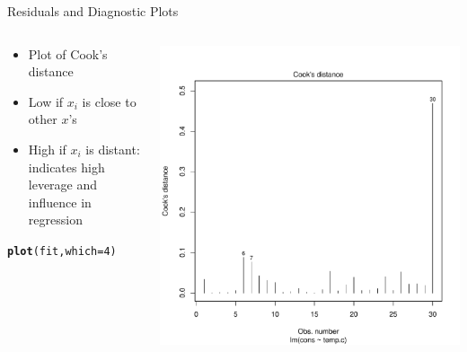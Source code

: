 \documentclass[aspectratio=169]{beamer}\usepackage[]{graphicx}\usepackage[]{color}
\makeatletter
\def\maxwidth{ %
  \ifdim\Gin@nat@width>\linewidth
    \linewidth
  \else
    \Gin@nat@width
  \fi
}
\newcommand{\hlnum}[1]{\textcolor[rgb]{0.686,0.059,0.569}{#1}}%
\newcommand{\hlstd}[1]{\textcolor[rgb]{0.345,0.345,0.345}{#1}}%
\newcommand{\hlkwc}[1]{\textcolor[rgb]{0.333,0.667,0.333}{#1}}%
\newcommand{\hlkwd}[1]{\textcolor[rgb]{0.737,0.353,0.396}{\textbf{#1}}}%
\newenvironment{kframe}{%
 \def\at@end@of@kframe{}%
 \ifinner\ifhmode%
  \def\at@end@of@kframe{\end{minipage}}%
  \begin{minipage}{\columnwidth}%
 \fi\fi%
 \def\FrameCommand##1{\hskip\@totalleftmargin \hskip-\fboxsep
 \colorbox{shadecolor}{##1}\hskip-\fboxsep
     \hskip-\linewidth \hskip-\@totalleftmargin \hskip\columnwidth}%
 \MakeFramed {\advance\hsize-\width
   \@totalleftmargin\z@ \linewidth\hsize
   \@setminipage}}%
 {\par\unskip\endMakeFramed%
 \at@end@of@kframe}
\newenvironment{knitrout}{}{} %
\makeatother
\begin{document}
\begin{frame}[fragile]{Residuals and Diagnostic Plots}
\begin{columns}
  \begin{column}{0.5\textwidth}
	\begin{itemize}
		\item Plot of Cook's distance
		\item Low if $x_i$ is close to other $x$'s
		\item High if $x_i$ is distant: indicates high leverage and influence in regression
	\end{itemize}
\begin{knitrout}\scriptsize
{}\color{fgcolor}\begin{kframe}
\begin{alltt}
\hlkwd{plot}\hlstd{(fit,} \hlkwc{which}\hlstd{=}\hlnum{4}\hlstd{)}
\end{alltt}
\end{kframe}
\end{knitrout}
  \end{column}
  \begin{column}{0.5\textwidth}
\begin{knitrout}\scriptsize
{}\color{fgcolor}
\includegraphics[width=\maxwidth]{figure/unnamed-chunk-15-1} 

\end{knitrout}
  \end{column}
\end{columns}
\end{frame}
\end{document}
